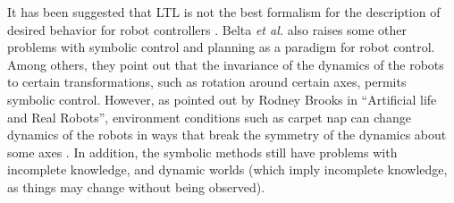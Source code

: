 %	
%			
It has been suggested that LTL is not the best formalism for the description of desired behavior for robot controllers \citep{belta2007symbolic}.
Belta \emph{et al.} also raises some other problems with symbolic control and planning as a paradigm for robot control. 
Among others, they point out that the invariance of the dynamics of the robots to certain transformations, such as rotation around certain axes, permits symbolic control. 
However, as pointed out by Rodney Brooks in ``Artificial life and Real Robots'', environment conditions such as carpet nap can change dynamics of the robots in ways that break the symmetry of the dynamics about some axes \citep{brooks1992artificial}.
In addition, the symbolic methods still have problems with incomplete knowledge, and dynamic worlds (which imply incomplete knowledge, as things may change without being observed). 
